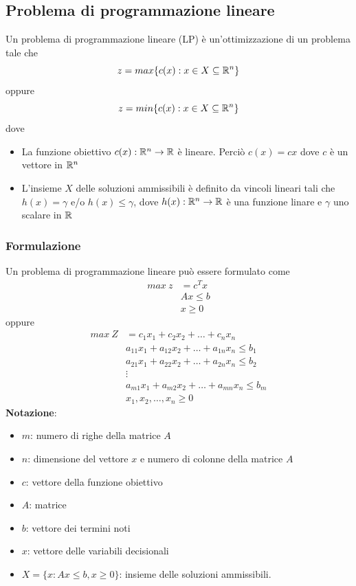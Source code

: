 \documentclass[12pt,a4paper]{article}
\begin{document}
\subsection{Problema di programmazione lineare}
Un problema di programmazione lineare (LP) è un'ottimizzazione di un problema tale che
$$z=max\{c(x):x\in X \subseteq \mathbb{R}^n\}$$
oppure 
$$z=min\{c(x):x\in X \subseteq \mathbb{R}^n\}$$
dove \begin{itemize}
\item La funzione obiettivo $c(x): \mathbb{R}^n \rightarrow \mathbb{R}$ è lineare. Perciò $c(x)=cx$ dove $c$ è un vettore in $\mathbb{R}^n$
\item L'insieme $X$ delle soluzioni ammissibili è definito da vincoli lineari tali che $h(x)=\gamma$ e/o $h(x) \leq \gamma$, dove $h(x): \mathbb{R}^n \rightarrow \mathbb{R}$ è una funzione linare e $\gamma$ uno scalare in $\mathbb{R}$
\end{itemize}

\subsubsection{Formulazione}
Un problema di programmazione lineare può essere formulato come
$$\begin{array}{rl}
max\ z & = c^Tx\\
& Ax \leq b\\
& x \geq 0
\end{array}$$
oppure
$$\begin{array}{rl}
max\ Z & = c_1x_1 + c_2x_2 +\dots + c_nx_n\\
& a_{11}x_1 + a_{12}x_2 + \dots + a_{1n}x_n \leq b_1\\
& a_{21}x_1 + a_{22}x_2 + \dots + a_{2n}x_n \leq b_2\\
& \vdots\\
& a_{m1}x_1 + a_{m2}x_2 + \dots + a_{mn}x_n \leq b_m\\
& x_1,x_2,\dots, x_n \geq 0
\end{array}$$
\textbf{Notazione}:\begin{itemize}
\item $m$: numero di righe della matrice $A$
\item $n$: dimensione del vettore $x$ e numero di colonne della matrice $A$
\item $c$: vettore della funzione obiettivo
\item $A$: matrice
\item $b$: vettore dei termini noti
\item $x$: vettore delle variabili decisionali
\item $X=\{x:Ax\leq b, x \geq 0\}$: insieme delle soluzioni ammissibili.
\end{itemize}
\end{document}
